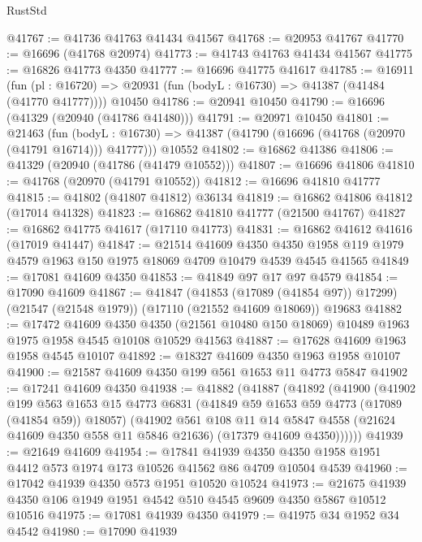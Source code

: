 \begin{lexlean}{RustStd}
\begin{coremodule}
@41767 := @41736 @41763 @41434 @41567
@41768 := @20953 @41767
@41770 := @16696 (@41768 @20974)
@41773 := @41743 @41763 @41434 @41567
@41775 := @16826 @41773 @4350
@41777 := @16696 @41775 @41617
@41785 := @16911
    (fun (pl : @16720) => @20931 (fun (bodyL : @16730) => @41387 (@41484 (@41770 @41777))))
    @10450
@41786 := @20941 @10450
@41790 := @16696 (@41329 (@20940 (@41786 @41480)))
@41791 := @20971 @10450
@41801 := @21463
    (fun (bodyL : @16730) => @41387 (@41790 (@16696 (@41768 (@20970 (@41791 @16714))) @41777)))
    @10552
@41802 := @16862 @41386
@41806 := @41329 (@20940 (@41786 (@41479 @10552)))
@41807 := @16696 @41806
@41810 := @41768 (@20970 (@41791 @10552))
@41812 := @16696 @41810 @41777
@41815 := @41802 (@41807 @41812) @36134
@41819 := @16862 @41806 @41812 (@17014 @41328)
@41823 := @16862 @41810 @41777 (@21500 @41767)
@41827 := @16862 @41775 @41617 (@17110 @41773)
@41831 := @16862 @41612 @41616 (@17019 @41447)
@41847 := @21514
    @41609
    @4350
    @4350
    @1958
    @119
    @1979
    @4579
    @1963
    @150
    @1975
    @18069
    @4709
    @10479
    @4539
    @4545
    @41565
@41849 := @17081 @41609 @4350
@41853 := @41849 @97 @17 @97 @4579
@41854 := @17090 @41609
@41867 := @41847
    (@41853 (@17089 (@41854 @97)) @17299)
    (@21547 (@21548 @1979))
    (@17110 (@21552 @41609 @18069))
    @19683
@41882 := @17472
    @41609
    @4350
    @4350
    (@21561 @10480 @150 @18069)
    @10489
    @1963
    @1975
    @1958
    @4545
    @10108
    @10529
    @41563
@41887 := @17628 @41609 @1963 @1958 @4545 @10107
@41892 := @18327 @41609 @4350 @1963 @1958 @10107
@41900 := @21587 @41609 @4350 @199 @561 @1653 @11 @4773 @5847
@41902 := @17241 @41609 @4350
@41938 := @41882
    (@41887
      (@41892
        (@41900
          (@41902
            @199
            @563
            @1653
            @15
            @4773
            @6831
            (@41849 @59 @1653 @59 @4773 (@17089 (@41854 @59)) @18057)
            (@41902
              @561
              @108
              @11
              @14
              @5847
              @4558
              (@21624 @41609 @4350 @558 @11 @5846 @21636)
              (@17379 @41609 @4350))))))
@41939 := @21649 @41609
@41954 := @17841
    @41939
    @4350
    @4350
    @1958
    @1951
    @4412
    @573
    @1974
    @173
    @10526
    @41562
    @86
    @4709
    @10504
    @4539
@41960 := @17042 @41939 @4350 @573 @1951 @10520 @10524
@41973 := @21675 @41939 @4350 @106 @1949 @1951 @4542 @510 @4545 @9609 @4350 @5867 @10512 @10516
@41975 := @17081 @41939 @4350
@41979 := @41975 @34 @1952 @34 @4542
@41980 := @17090 @41939

\end{coremodule}
\end{lexlean}
